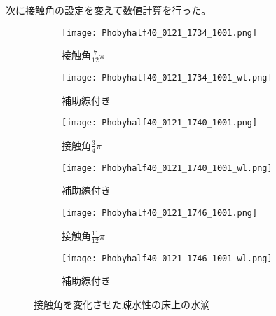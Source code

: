 \documentclass[]{jsarticle}
\begin{document}
次に接触角の設定を変えて数値計算を行った。
\begin{figure}[H]
  \centering
  \begin{subfigure}{0.45\columnwidth}
    \centering
    \texttt{[image: Phobyhalf40\_0121\_1734\_1001.png]}
    \caption{接触角$\frac{7}{12}\pi$}
    \label{fig:phoby_pi3}
  \end{subfigure}
  \begin{subfigure}{0.45\columnwidth}
    \centering
    \texttt{[image: Phobyhalf40\_0121\_1734\_1001\_wl.png]}
    \caption{補助線付き}
    \label{fig:phoby_pi3wl}
  \end{subfigure}

  \begin{subfigure}{0.45\columnwidth}
    \centering
    \texttt{[image: Phobyhalf40\_0121\_1740\_1001.png]}
    \caption{接触角$\frac{3}{4}\pi$}
    \label{fig:phoby_pi4}
  \end{subfigure}
  \begin{subfigure}{0.45\columnwidth}
    \centering
    \texttt{[image: Phobyhalf40\_0121\_1740\_1001\_wl.png]}
    \caption{補助線付き}
    \label{fig:phoby_pi4wl}
  \end{subfigure}

  \begin{subfigure}{0.45\columnwidth}
    \centering
    \texttt{[image: Phobyhalf40\_0121\_1746\_1001.png]}
    \caption{接触角$\frac{11}{12}\pi$}
    \label{fig:phoby_pi6}
  \end{subfigure}
  \begin{subfigure}{0.45\columnwidth}
    \centering
    \texttt{[image: Phobyhalf40\_0121\_1746\_1001\_wl.png]}
    \caption{補助線付き}
    \label{fig:phoby_pi6wl}
  \end{subfigure}

  \caption{接触角を変化させた疎水性の床上の水滴}
\end{figure}
\end{document}
